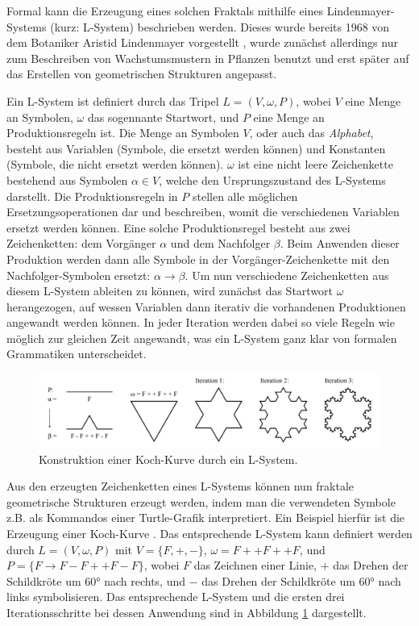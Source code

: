 Formal kann die Erzeugung eines solchen Fraktals mithilfe eines Lindenmayer-Systems (kurz: L-System) beschrieben werden.
Dieses wurde bereits 1968 von dem Botaniker Aristid Lindenmayer vorgestellt \cite{38_lindenmayer}, wurde zunächst allerdings
nur zum Beschreiben von Wachstumsmustern in Pflanzen benutzt und erst später auf das Erstellen von geometrischen Strukturen
angepasst. \cite{39_lindenmayer_prusinkiewicz}

Ein L-System ist definiert durch das Tripel \(L = (V,\omega,P)\), wobei \(V\) eine Menge an Symbolen, \(\omega\) das
sogennante Startwort, und \(P\) eine Menge an Produktionsregeln ist. Die Menge an Symbolen \(V\), oder auch das
\textit{Alphabet}, besteht aus Variablen (Symbole, die ersetzt werden können) und Konstanten (Symbole, die nicht
ersetzt werden können). \(\omega\) ist eine nicht leere Zeichenkette bestehend aus Symbolen \(\alpha \in V\), welche den
Ursprungszustand des L-Systems darstellt. Die Produktionsregeln in \(P\) stellen alle möglichen Ersetzungsoperationen
dar und beschreiben, womit die verschiedenen Variablen ersetzt werden können. Eine solche Produktionsregel besteht
aus zwei Zeichenketten: dem Vorgänger \(\alpha\) und dem Nachfolger \(\beta\). Beim Anwenden dieser Produktion werden dann
alle Symbole in der Vorgänger-Zeichenkette mit den Nachfolger-Symbolen ersetzt: \(\alpha \rightarrow \beta\). Um nun verschiedene
Zeichenketten aus diesem L-System ableiten zu können, wird zunächst das Startwort \(\omega\) herangezogen, auf
wessen Variablen dann iterativ die vorhandenen Produktionen angewandt werden können. In jeder Iteration werden dabei
so viele Regeln wie möglich zur gleichen Zeit angewandt, was ein L-System ganz klar von formalen Grammatiken unterscheidet.
\cite{39_lindenmayer_prusinkiewicz}

\begin{figure}[t]
    \centering
    \includegraphics[width=\imgWidth]{images/koch_curve.pdf}
    \caption{Konstruktion einer Koch-Kurve durch ein L-System.}
    \label{fig:koch_curve}
\end{figure}

Aus den erzeugten Zeichenketten eines L-Systems können nun fraktale geometrische Strukturen erzeugt werden, indem man die
verwendeten Symbole z.B. als Kommandos einer Turtle-Grafik \cite{41_papert} interpretiert. Ein Beispiel hierfür ist die Erzeugung
einer Koch-Kurve \cite{40_koch}. Das entsprechende L-System kann definiert werden durch \(L = (V,\omega,P)\) mit
\(V = \{F,+,-\}\), \(\omega = F++F++F\), und \(P = \{F \rightarrow F-F++F-F\}\), wobei \(F\) das Zeichnen einer Linie,
\(+\) das Drehen der Schildkröte um 60° nach rechts, und \(-\) das Drehen der Schildkröte um 60° nach links symbolisieren.
Das entsprechende L-System und die ersten drei Iterationsschritte bei dessen Anwendung sind in Abbildung \ref{fig:koch_curve}
dargestellt. \cite{42_mcbride}

